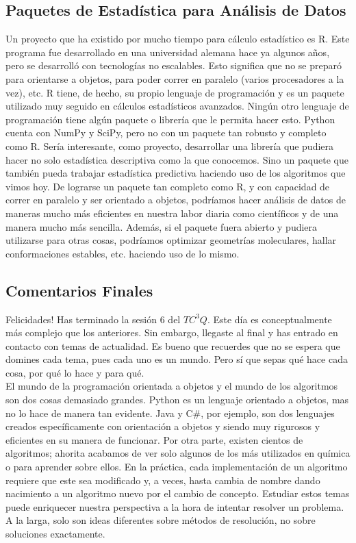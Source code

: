 \documentclass[10pt,letterpaper]{article}
\begin{document}
\subsection{Paquetes de Estad\'istica para An\'alisis de Datos}
Un proyecto que ha existido por mucho tiempo para c\'alculo estad\'istico es R. Este programa fue desarrollado en una universidad alemana hace ya algunos a\~nos, pero se desarroll\'o con tecnolog\'ias no escalables. Esto significa que no se prepar\'o para orientarse a objetos, para poder correr en paralelo (varios procesadores a la vez), etc. R tiene, de hecho, su propio lenguaje de programaci\'on y es un paquete utilizado muy seguido en c\'alculos estad\'isticos avanzados. Ning\'un otro lenguaje de programaci\'on tiene alg\'un paquete o librer\'ia que le permita hacer esto. Python cuenta con NumPy y SciPy, pero no con un paquete tan robusto y completo como R. Ser\'ia interesante, como proyecto, desarrollar una librer\'ia que pudiera hacer no solo estad\'istica descriptiva como la que conocemos. Sino un paquete que tambi\'en pueda trabajar estad\'istica predictiva haciendo uso de los algoritmos que vimos hoy. De lograrse un paquete tan completo como R, y con capacidad de correr en paralelo y ser orientado a objetos, podr\'iamos hacer an\'alisis de datos de maneras mucho m\'as eficientes en nuestra labor diaria como cient\'ificos y de una manera mucho m\'as sencilla. Adem\'as, si el paquete fuera abierto y pudiera utilizarse para otras cosas, podr\'iamos optimizar geometr\'ias moleculares, hallar conformaciones estables, etc. haciendo uso de lo mismo.

\subsection{Comentarios Finales}
Felicidades! Has terminado la sesi\'on 6 del $TC^3 Q$. Este d\'ia es conceptualmente m\'as complejo que los anteriores. Sin embargo, llegaste al final y has entrado en contacto con temas de actualidad. Es bueno que recuerdes que no se espera que domines cada tema, pues cada uno es un mundo. Pero s\'i que sepas qu\'e hace cada cosa, por qu\'e lo hace y para qu\'e.\\

El mundo de la programaci\'on orientada a objetos y el mundo de los algoritmos son dos cosas demasiado grandes. Python es un lenguaje orientado a objetos, mas no lo hace de manera tan evidente. Java y C\#, por ejemplo, son dos lenguajes creados espec\'ificamente con orientaci\'on a objetos y siendo muy rigurosos y eficientes en su manera de funcionar. Por otra parte, existen cientos de algoritmos; ahorita acabamos de ver solo algunos de los m\'as utilizados en qu\'imica o para aprender sobre ellos. En la pr\'actica, cada implementaci\'on de un algoritmo requiere que este sea modificado y, a veces, hasta cambia de nombre dando nacimiento a un algoritmo nuevo por el cambio de concepto. Estudiar estos temas puede enriquecer nuestra perspectiva a la hora de intentar resolver un problema. A la larga, solo son ideas diferentes sobre m\'etodos de resoluci\'on, no sobre soluciones exactamente.\\
\end{document}
